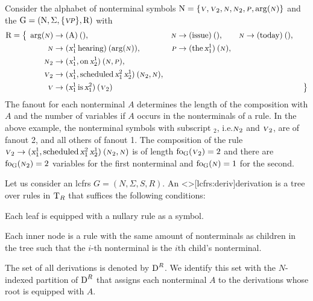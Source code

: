 \documentclass[../../document.tex]{subfiles}
\begin{document}
    \begin{example}\label{ex:lcfrs:rules}
        Consider the alphabet of nonterminal symbols \(\mathrm{N} = \{\textsc{\textsl{v}}, \textsc{\textsl{v}}_2, \textsc{\textsl{n}}, \textsc{\textsl{n}}_2, \textsc{\textsl{p}}, \arg(\textsc{\textsl{n}})\}\) and the  \(\mathrm{G} = (\mathrm{N}, \Sigma, \{\textsc{\textsl{vp}}\}, \mathrm{R})\) with
        \begin{align*}
            \mathrm{R} = \big\{\;
            \arg(\textsc{\textsl{n}}) &\to (\text{A})\:(), &\textsc{\textsl{n}} &\to (\text{issue})\:(), &\textsc{\textsl{n}} &\to (\text{today})\:(), &\\
            \textsc{\textsl{n}} &\to (\textsl{x}_1^1 \, \text{hearing})\:(\arg(\textsc{\textsl{n}})), &\textsc{\textsl{p}} &\to (\text{the}\,\textsl{x}_1^1)\:(\textsc{\textsl{n}}), \\
            \textsc{\textsl{n}}_2 &\to (\textsl{x}_1^1, \text{on} \, \textsl{x}_2^1)\:(\textsc{\textsl{n}}, \textsc{\textsl{p}}), \\
            \textsc{\textsl{v}}_2 &\to (\textsl{x}_1^1, \text{scheduled} \, \textsl{x}_1^2 \, \textsl{x}_2^1)\:(\textsc{\textsl{n}}_2, \textsc{\textsl{n}}), \\
            \textsc{\textsl{v}} &\to (\textsl{x}_1^1 \, \text{is} \, \textsl{x}_1^2)\:(\textsc{\textsl{v}}_2)
            &&&&&\;\big\}
        \end{align*}
        The fanout for each nonterminal \(A\) determines the length of the composition with  \(A\) and the number of variables if \(A\) occurs in the  nonterminals of a rule.
        In the above example, the nonterminal symbols with subscript \(_2\), i.e.\@ \(\textsc{\textsl{n}}_2\) and \(\textsc{\textsl{v}}_2\), are of fanout 2, and all others of fanout 1.
        The composition of the rule \(\textsc{\textsl{v}}_2 \to (\textsl{x}_1^1, \text{scheduled} \, \textsl{x}_1^2 \, \textsl{x}_2^1)\:(\textsc{\textsl{n}}_2, \textsc{\textsl{n}})\) is of length \(\operatorname{fo}_{\mathrm{G}}(\textsc{\textsl{v}}_2) = 2\) and there are \(\operatorname{fo}_{\mathrm{G}}(\textsc{\textsl{n}}_2) = 2\) variables for the first  nonterminal and \(\operatorname{fo}_{\mathrm{G}}(\textsc{\textsl{n}}) = 1\) for the second.
    \end{example}

    \begin{definition}[Derivation]
        Let us consider an lcfrs \(G = (N, \varSigma, S, R)\).
        An  <\lcfrs>[lcfrs:deriv]{derivation} is a tree over rules in \(\operatorname{T}_R\) that suffices the following conditions:
        \begin{compactitem}
            \item Each leaf is equipped with a nullary rule as a symbol.
            \item Each inner node is a rule with the same amount of  nonterminals as children in the tree such that the \(i\)-th  nonterminal is the \(i\)th child's  nonterminal.
        \end{compactitem}
        The set of all  derivations is denoted by \(\operatorname{D}^R\).
        We identify this set with the \(N\)-indexed partition of \(\operatorname{D}^R\) that assigns each nonterminal \(A\) to the derivations whose root is equipped with  \(A\).
    \end{definition}
\end{document}
